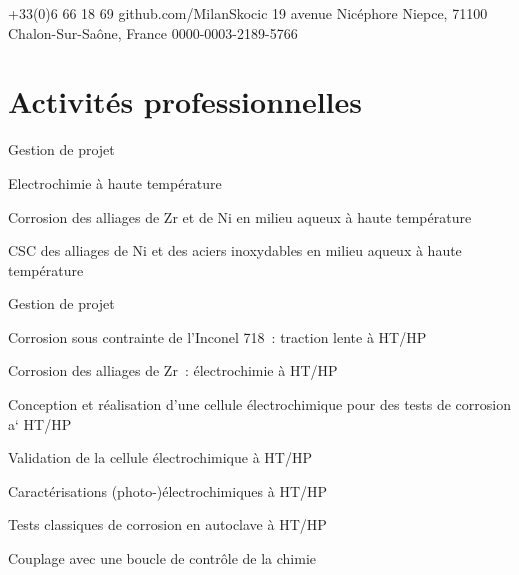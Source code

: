 \documentclass[11pt, a4paper, notitlepage]{article}
\begin{document}
\selectfont
\pagestyle{empty}
	\newpage
	
	
	
	{+33(0)6 66 18 69}
	{github.com/MilanSkocic}
	{19 avenue Nicéphore Niepce, 71100 Chalon-Sur-Saône, France}
	{0000-0003-2189-5766}


	\section*{Activités professionnelles}
	\begin{jobdetails}		
		\item Gestion de projet
		\item Electrochimie à haute température
		\item Corrosion des alliages de Zr et de Ni en milieu aqueux à haute température
        \item CSC des alliages de Ni et des aciers inoxydables en milieu aqueux à haute température
	\end{jobdetails}

	\begin{jobdetails}
		\item Gestion de projet
		\item Corrosion sous contrainte de l’Inconel 718 : traction lente à HT/HP
		\item Corrosion des alliages de Zr : électrochimie à HT/HP
	\end{jobdetails}

        \begin{jobdetails}	
		\item Conception et réalisation d’une cellule électrochimique pour des tests de corrosion a` HT/HP
		\item Validation de la cellule électrochimique à HT/HP
		\item Caractérisations (photo-)électrochimiques à HT/HP
		\item Tests classiques de corrosion en autoclave à HT/HP
		\item Couplage avec une boucle de contrôle de la chimie
	\end{jobdetails}
	
\end{document}
